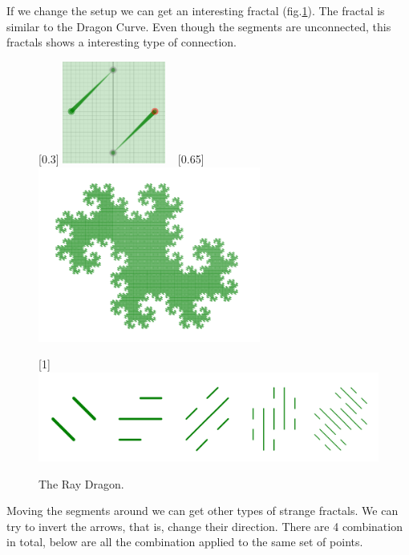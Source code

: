             If we change the setup we can get an interesting fractal (fig.\ref{ray_02}).
            The fractal is similar to the Dragon Curve.
            Even though the segments are unconnected, this fractals shows a interesting type of connection.


            \begin{figure}[H]
                \centering
                \caption{\label{ray_02} The Ray Dragon.}
                [0.3\textwidth]
                    {\includegraphics[width=0.3\textwidth]{img/Simple_Techniques/Cases/rays/ray_set_02.png}}
                ~
                [0.65\textwidth]
                    {\includegraphics[width=0.65\textwidth]{img/Simple_Techniques/Cases/rays/ray_02.png}}

                [1\textwidth]
                    {\includegraphics[width=1\textwidth]{img/Simple_Techniques/Cases/rays/ray_03.png}}
            \end{figure}

            Moving the segments around we can get other types of strange fractals.
            We can try to invert the arrows, that is, change their direction.
            There are 4 combination in total, below are all the combination applied to the same set of points.

